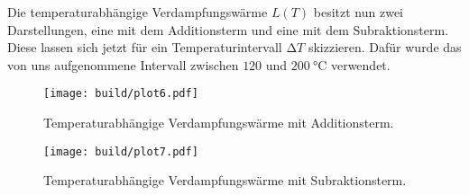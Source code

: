 Die temperaturabhängige Verdampfungswärme $L(T)$ besitzt nun zwei Darstellungen, eine mit dem Additionsterm und eine mit dem Subraktionsterm. Diese lassen sich jetzt für 
ein Temperaturintervall $\increment T$ skizzieren. Dafür wurde das von uns aufgenommene Intervall zwischen $120$ und $\SI{200}{\celsius}$ verwendet.
\begin{figure}[h]
    \centering
    \texttt{[image: build/plot6.pdf]}
    \caption{Temperaturabhängige Verdampfungswärme mit Additionsterm.}
    \label{fig:plot6}
\end{figure}
\begin{figure}[h]
    \centering
    \texttt{[image: build/plot7.pdf]}
    \caption{Temperaturabhängige Verdampfungswärme mit Subraktionsterm.}
    \label{fig:plot7}
\end{figure}
\newpage
